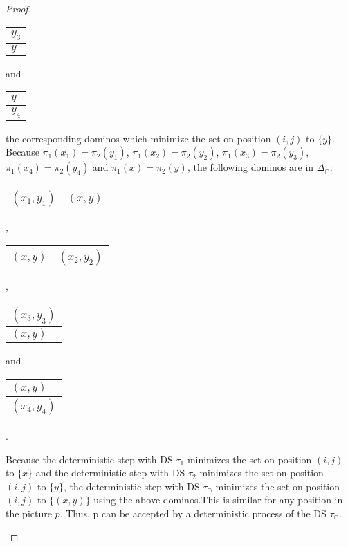 \begin{proof}
\begin{compactitem}
\begin{tabular}{|C{0.8cm}|} 
\hline 
$y_3$ \tabularnewline 
\hline
$y$ \tabularnewline
\hline 
\end{tabular} 
and 
\begin{tabular}{|C{0.8cm}|} 
\hline 
$y$ \tabularnewline 
\hline
$y_4$ \tabularnewline
\hline 
\end{tabular}
the corresponding dominos which minimize the set on position $(i, j)$ to $\lbrace y\rbrace$.
Because $\pi_1(x_1) = \pi_2(y_1)$, $\pi_1(x_2) = \pi_2(y_2)$, $\pi_1(x_3)= \pi_2(y_3)$, $\pi_1(x_4)
= \pi_2(y_4)$ and $\pi_1(x) = \pi_2(y)$, the following dominos are in $\Delta_\cap$:
\begin{center}
\begin{tabular}{|C{1.7cm}|C{1.7cm}|} 
\hline 
$(x_1, y_1)$ & \hspace{0.16cm}$(x, y)$\hspace{0.16cm} \tabularnewline 
\hline 
\end{tabular}, 
\begin{tabular}{|C{1.7cm}|C{1.7cm}|} 
\hline 
\hspace{0.16cm}$(x, y)$\hspace{0.16cm} & $(x_2, y_2)$ \tabularnewline 
\hline 
\end{tabular}, 
\begin{tabular}{|C{1.7cm}|} 
\hline 
$(x_3, y_3)$ \tabularnewline 
\hline
$(x, y)$ \tabularnewline
\hline 
\end{tabular} and 
\begin{tabular}{|C{1.7cm}|} 
\hline 
$(x, y)$ \tabularnewline 
\hline
$(x_4, y_4)$ \tabularnewline
\hline 
\end{tabular}.
\end{center}
Because the deterministic step with DS $\tau_1$ minimizes the set on position $(i, j)$ to $\lbrace
x\rbrace$ and the deterministic step with DS $\tau_2$ minimizes the set on position $(i, j)$ to
$\lbrace y \rbrace$, the deterministic step with DS $\tau_\cap$ minimizes the set on position $(i,
j)$ to $\lbrace (x, y)\rbrace$ using the above dominos.This is similar for any position in the
picture $p$. Thus, p can be accepted by a deterministic process of the DS $\tau_\cap$.
\end{compactitem}
\end{proof}